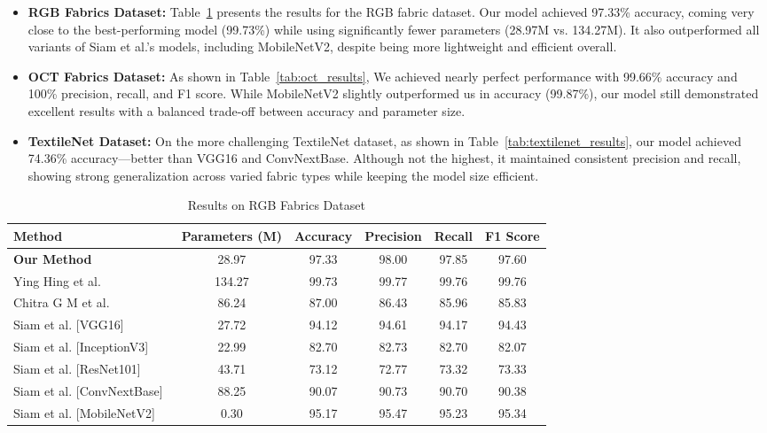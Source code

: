 \begin{itemize}[topsep=0pt, noitemsep]
    \item \textbf{RGB Fabrics Dataset:} Table~\ref{tab:rgb_results} presents the results for the RGB fabric dataset. Our model achieved 97.33\% accuracy, coming very close to the best-performing model (99.73\%) while using significantly fewer parameters (28.97M vs. 134.27M). It also outperformed all variants of Siam et al.’s models, including MobileNetV2, despite being more lightweight and efficient overall.

    \item \textbf{OCT Fabrics Dataset:} As shown in Table~\ref{tab:oct_results}, We achieved nearly perfect performance with 99.66\% accuracy and 100\% precision, recall, and F1 score. While MobileNetV2 slightly outperformed us in accuracy (99.87\%), our model still demonstrated excellent results with a balanced trade-off between accuracy and parameter size.

    \item \textbf{TextileNet Dataset:} On the more challenging TextileNet dataset, as shown in Table~\ref{tab:textilenet_results}, our model achieved 74.36\% accuracy—better than VGG16 and ConvNextBase. Although not the highest, it maintained consistent precision and recall, showing strong generalization across varied fabric types while keeping the model size efficient.
\end{itemize}

\begin{table}[h]
\centering
\caption{Results on RGB Fabrics Dataset}
\label{tab:rgb_results}
\begin{adjustbox}{max width=\textwidth}
\begin{tabular}{lccccc}
\toprule
\textbf{Method} & \textbf{Parameters (M)} & \textbf{Accuracy} & \textbf{Precision} & \textbf{Recall} & \textbf{F1 Score} \\
\midrule
\textbf{Our Method} & 28.97 & 97.33 & 98.00 & 97.85 & 97.60 \\
Ying Hing et al.~\cite{hong2024research} & 134.27 & 99.73 & 99.77 & 99.76 & 99.76 \\
Chitra G M et al.~\cite{chitra2023fabric} & 86.24 & 87.00 & 86.43 & 85.96 & 85.83 \\
Siam et al. [VGG16]~\cite{siam2023textilenet} & 27.72 & 94.12 & 94.61 & 94.17 & 94.43 \\
Siam et al. [InceptionV3]~\cite{siam2023textilenet} & 22.99 & 82.70 & 82.73 & 82.70 & 82.07 \\
Siam et al. [ResNet101]~\cite{siam2023textilenet} & 43.71 & 73.12 & 72.77 & 73.32 & 73.33 \\
Siam et al. [ConvNextBase]~\cite{siam2023textilenet} & 88.25 & 90.07 & 90.73 & 90.70 & 90.38 \\
Siam et al. [MobileNetV2]~\cite{siam2023textilenet} & 0.30 & 95.17 & 95.47 & 95.23 & 95.34 \\
\bottomrule
\end{tabular}
\end{adjustbox}
\end{table}

